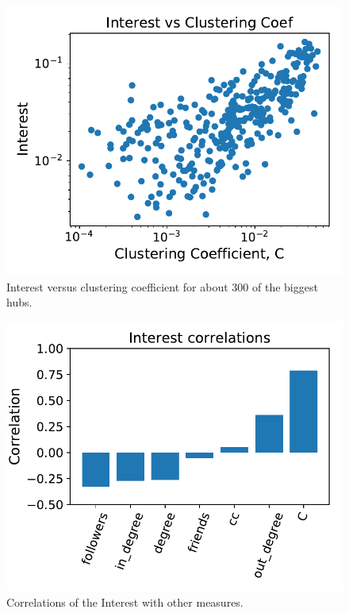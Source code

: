 \documentclass[11pt, twoside]{report}
\begin{document}
\begin{minipage}[b]{0.5\textwidth}
   \centering
    \begin{figure}[H]
      \includegraphics[width=\textwidth]{../../scripts/network_analysis/imgs/hubs_interest_corr.pdf}            
          \caption{Interest versus clustering coefficient for about 300 of the biggest hubs.}
      \label{fig:interest_corr}
\end{figure}
\end{minipage}
\begin{minipage}[b]{0.5\textwidth}
  \begin{figure}[H]
  \centering
  \includegraphics[width=\textwidth]{../../scripts/network_analysis/imgs/hubs_interest_corr_hist.pdf}
  \caption{Correlations of the Interest with other measures.}
  \label{fig:interest_corr_hist}
\end{figure}
\end{minipage}
\end{document}
